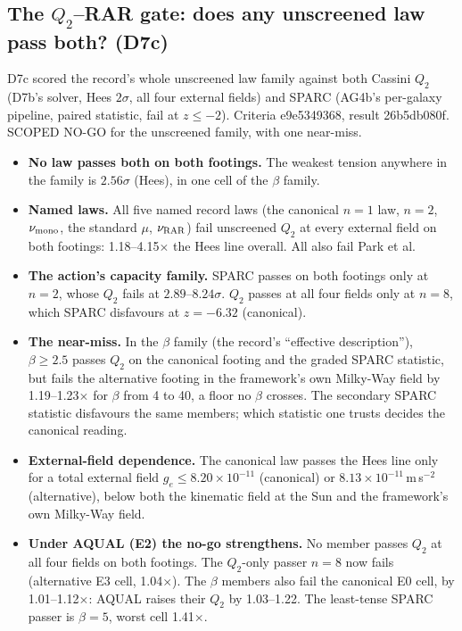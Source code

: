 \documentclass[10pt]{article}
\begin{document}
\subsection{The $Q_2$--RAR gate: does any unscreened law pass both? (D7c)}
D7c scored the record's whole unscreened law family against both Cassini $Q_2$ (D7b's solver, Hees $2\sigma$, all four external fields) and SPARC (AG4b's per-galaxy pipeline, paired statistic, fail at $z\le-2$). Criteria e9e5349368, result 26b5db080f. SCOPED NO-GO for the unscreened family, with one near-miss.
\begin{itemize}
\item \textbf{No law passes both on both footings.} The weakest tension anywhere in the family is $2.56\sigma$ (Hees), in one cell of the $\beta$ family.
\item \textbf{Named laws.} All five named record laws (the canonical $n=1$ law, $n=2$, $\nu_{\rm mono}$, the standard $\mu$, $\nu_{\rm RAR}$) fail unscreened $Q_2$ at every external field on both footings: 1.18--4.15$\times$ the Hees line overall. All also fail Park et al.
\item \textbf{The action's capacity family.} SPARC passes on both footings only at $n=2$, whose $Q_2$ fails at $2.89$--$8.24\sigma$. $Q_2$ passes at all four fields only at $n=8$, which SPARC disfavours at $z=-6.32$ (canonical).
\item \textbf{The near-miss.} In the $\beta$ family (the record's ``effective description''), $\beta\ge2.5$ passes $Q_2$ on the canonical footing and the graded SPARC statistic, but fails the alternative footing in the framework's own Milky-Way field by 1.19--1.23$\times$ for $\beta$ from 4 to 40, a floor no $\beta$ crosses. The secondary SPARC statistic disfavours the same members; which statistic one trusts decides the canonical reading.
\item \textbf{External-field dependence.} The canonical law passes the Hees line only for a total external field $g_e\le8.20\times10^{-11}$ (canonical) or $8.13\times10^{-11}$\,m\,s$^{-2}$ (alternative), below both the kinematic field at the Sun and the framework's own Milky-Way field.
\item \textbf{Under AQUAL (E2) the no-go strengthens.} No member passes $Q_2$ at all four fields on both footings. The $Q_2$-only passer $n=8$ now fails (alternative E3 cell, 1.04$\times$). The $\beta$ members also fail the canonical E0 cell, by 1.01--1.12$\times$: AQUAL raises their $Q_2$ by 1.03--1.22. The least-tense SPARC passer is $\beta=5$, worst cell 1.41$\times$.

\end{itemize}
\end{document}
